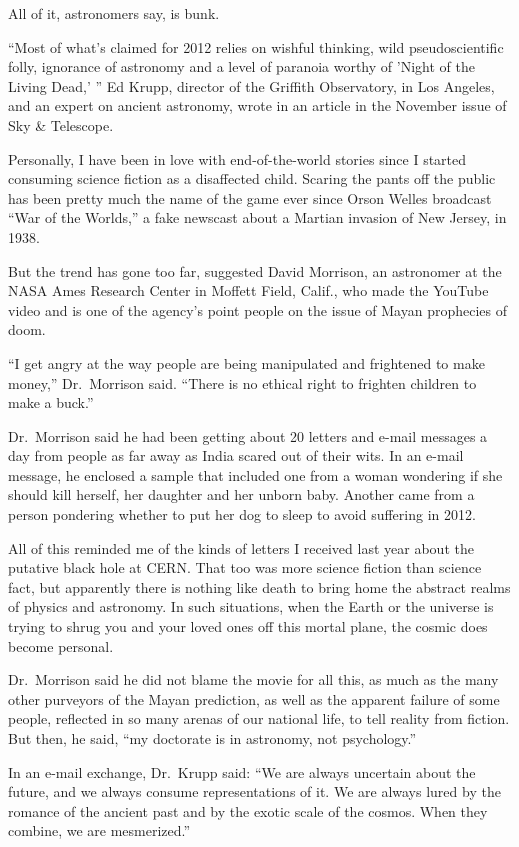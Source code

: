 ﻿\documentclass[12pt]{article}
\begin{document}
All of it, astronomers say, is bunk.

``Most of what's claimed for 2012 relies on wishful thinking, wild pseudoscientific folly, ignorance
of astronomy and a level of paranoia worthy of 'Night of the Living Dead,' '' Ed Krupp, director of
the Griffith Observatory, in Los Angeles, and an expert on ancient astronomy, wrote in an article in
the November issue of Sky \& Telescope.

Personally, I have been in love with end-of-the-world stories since I started consuming science
fiction as a disaffected child. Scaring the pants off the public has been pretty much the name of
the game ever since Orson Welles broadcast ``War of the Worlds,'' a fake newscast about a Martian
invasion of New Jersey, in 1938.

But the trend has gone too far, suggested David Morrison, an astronomer at the NASA Ames Research
Center in Moffett Field, Calif., who made the YouTube video and is one of the agency's point people
on the issue of Mayan prophecies of doom.

``I get angry at the way people are being manipulated and frightened to make money,'' Dr.~Morrison
said. ``There is no ethical right to frighten children to make a buck.''

Dr.~Morrison said he had been getting about 20 letters and e-mail messages a day from people as far
away as India scared out of their wits. In an e-mail message, he enclosed a sample that included one
from a woman wondering if she should kill herself, her daughter and her unborn baby. Another came
from a person pondering whether to put her dog to sleep to avoid suffering in 2012.

All of this reminded me of the kinds of letters I received last year about the putative black hole
at CERN. That too was more science fiction than science fact, but apparently there is nothing like
death to bring home the abstract realms of physics and astronomy. In such situations, when the Earth
or the universe is trying to shrug you and your loved ones off this mortal plane, the cosmic does
become personal.

Dr.~Morrison said he did not blame the movie for all this, as much as the many other purveyors of
the Mayan prediction, as well as the apparent failure of some people, reflected in so many arenas of
our national life, to tell reality from fiction. But then, he said, ``my doctorate is in astronomy,
not psychology.''

In an e-mail exchange, Dr.~Krupp said: ``We are always uncertain about the future, and we always
consume representations of it. We are always lured by the romance of the ancient past and by the
exotic scale of the cosmos. When they combine, we are mesmerized.''
\end{document}
